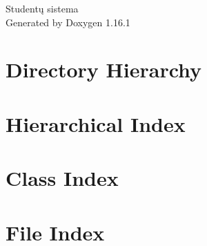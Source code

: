 \documentclass[twoside]{book}
\newcommand{\+}{\discretionary{\mbox{\scriptsize$\hookleftarrow$}}{}{}}
\newcommand{\clearemptydoublepage}{%
    \newpage{\pagestyle{empty}\cleardoublepage}%
  }
\begin{document}
  \raggedbottom
    \hypersetup{pageanchor=false,
                bookmarksnumbered=true,
                pdfencoding=unicode
               }
  \begin{titlepage}
  \vspace*{7cm}
  \begin{center}%
  {\Large Studentų sistema}\\
  \vspace*{1cm}
  {\large Generated by Doxygen 1.16.1}\\
  \end{center}
  \end{titlepage}
  \clearemptydoublepage
  \tableofcontents
  \clearemptydoublepage
  \hypersetup{pageanchor=true}



\chapter{Directory Hierarchy}

\chapter{Hierarchical Index}

\chapter{Class Index}

\chapter{File Index}

\end{document}
